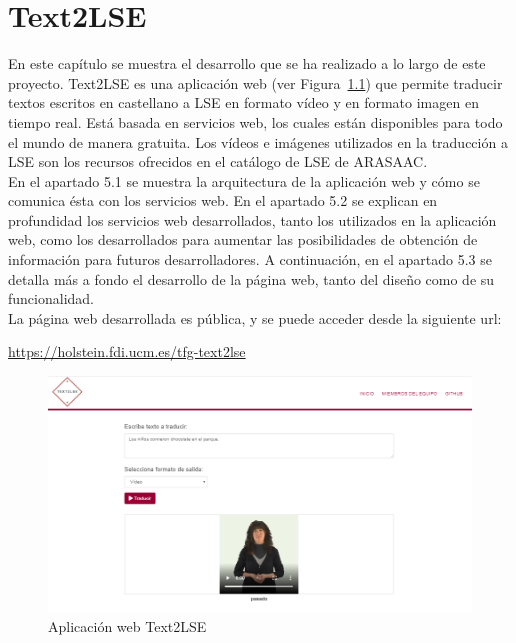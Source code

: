 %
%

\chapter{Text2LSE}


En este capítulo se muestra el desarrollo que se ha realizado a lo largo de este proyecto. Text2LSE es una aplicación web (ver Figura~\ref {fig: imgWebText2LSE}) que permite traducir textos escritos en castellano a LSE en formato vídeo y en formato imagen en tiempo real. Está basada en servicios web, los cuales están disponibles para todo el mundo de manera gratuita. Los vídeos e imágenes utilizados en la traducción a LSE son los recursos ofrecidos en el catálogo de LSE de ARASAAC. \\

En el apartado 5.1 se muestra la arquitectura de la aplicación web y cómo se comunica ésta con los servicios web. En el apartado 5.2 se explican en profundidad los servicios web desarrollados, tanto los utilizados en la aplicación web, como los desarrollados para aumentar las posibilidades de obtención de información para futuros desarrolladores. A continuación, en el apartado 5.3 se detalla más a fondo el desarrollo de la página web, tanto del diseño como de su funcionalidad. \\

La página web desarrollada es pública, y se puede acceder desde la siguiente url:

\begin{shaded}
	\url{https://holstein.fdi.ucm.es/tfg-text2lse }	
\end{shaded}

\begin{figure}[]
	\centering
	\includegraphics[width=1\textwidth]{Imagenes/Fuentes/Text2LSE/WebText2LSE.png}
	\caption{Aplicación web Text2LSE }
	\label {fig: imgWebText2LSE}
\end{figure}

